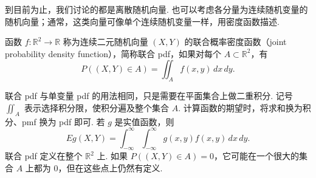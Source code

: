 到目前为止，我们讨论的都是离散随机向量. 也可以考虑各分量为连续随机变量的随机向量；通常，这类向量可像单个连续随机变量一样，用密度函数描述.
\begin{definition}\label{def:4.1.10}
函数 $f:\mathbb R^2\to\mathbb R$ 称为连续二元随机向量 $(X,Y)$ 的联合概率密度函数（joint probability density function），简称联合 pdf，如果对每个 $A\subset\mathbb R^2$，有
$$P((X,Y)\in A)=\iint_A f(x,y)\,dx\,dy.$$
\end{definition}
联合 pdf 与单变量 pdf 的用法相同，只是需要在平面集合上做二重积分. 记号 $\iint_A$ 表示选择积分限，使积分遍及整个集合 $A$. 计算函数的期望时，将求和换为积分、pmf 换为 pdf 即可. 若 $g$ 是实值函数，则
\begin{equation}\label{eq:4.1.1}
Eg(X,Y)=\int_{-\infty}^{\infty}\int_{-\infty}^{\infty}g(x,y)f(x,y)\,dx\,dy.
\end{equation}
联合 pdf 定义在整个 $\mathbb R^2$ 上. 如果 $P((X,Y)\in A)=0$，它可能在一个很大的集合 $A$ 上都为 0，但在这些点上仍然有定义.

